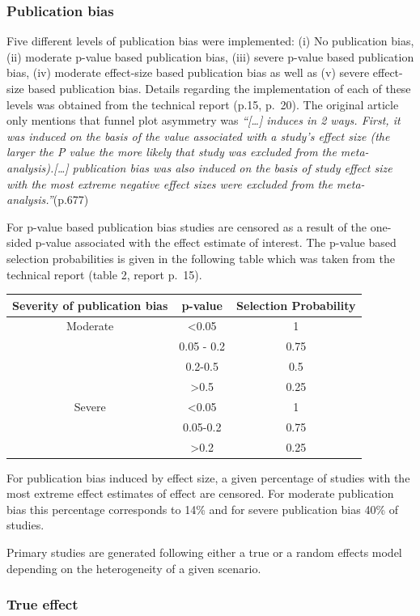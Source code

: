 \documentclass[
  english,
  doc,floatsintext,draftall]{apa6}
\begin{document}
\hypertarget{publication-bias}{%
\subsubsection{Publication bias}\label{publication-bias}}

Five different levels of publication bias were implemented: (i) No publication bias, (ii) moderate p-value based publication bias, (iii) severe p-value based publication bias, (iv) moderate effect-size based publication bias as well as (v) severe effect-size based publication bias.
Details regarding the implementation of each of these levels was obtained from the technical report (p.15, p.~20). The original article only mentions that funnel plot asymmetry was \emph{\enquote{{[}\ldots{]} induces in 2 ways. First, it was induced on the basis of the value associated with a study's effect size (the larger the P value the more likely that study was excluded from the meta-analysis).{[}\ldots{]} publication bias was also induced on the basis of study effect size with the most extreme negative effect sizes were excluded from the meta-analysis.}}(p.677)

For p-value based publication bias studies are censored as a result of the one-sided p-value associated with the effect estimate of interest. The p-value based selection probabilities is given in the following table which was taken from the technical report (table 2, report p.~15).

\begin{longtable}[]{@{}ccc@{}}
\toprule
Severity of publication bias & p-value & Selection Probability\tabularnewline
\midrule
\endhead
Moderate & \textless0.05 & 1\tabularnewline
& 0.05 - 0.2 & 0.75\tabularnewline
& 0.2-0.5 & 0.5\tabularnewline
& \textgreater0.5 & 0.25\tabularnewline
Severe & \textless0.05 & 1\tabularnewline
& 0.05-0.2 & 0.75\tabularnewline
& \textgreater0.2 & 0.25\tabularnewline
\bottomrule
\end{longtable}

For publication bias induced by effect size, a given percentage of studies with the most extreme effect estimates of effect are censored. For moderate publication bias this percentage corresponds to 14\% and for severe publication bias 40\% of studies.

Primary studies are generated following either a true or a random effects model depending on the heterogeneity of a given scenario.

\hypertarget{true-effect}{%
\subsubsection{True effect}\label{true-effect}}
\end{document}
